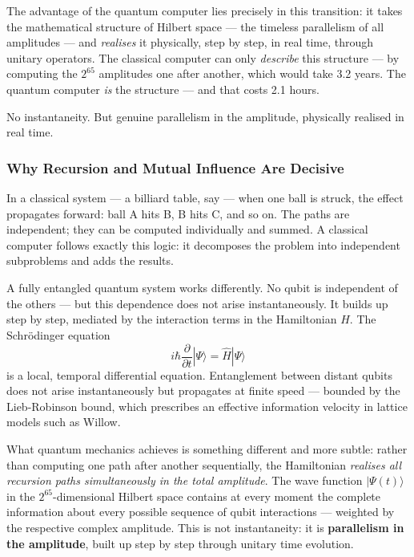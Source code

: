 The advantage of the quantum computer lies precisely in this transition: it takes
the mathematical structure of Hilbert space — the timeless parallelism of all
amplitudes — and \emph{realises} it physically, step by step, in real time, through
unitary operators. The classical computer can only \emph{describe} this structure —
by computing the $2^{65}$ amplitudes one after another, which would take 3.2 years.
The quantum computer \emph{is} the structure — and that costs 2.1 hours.

No instantaneity. But genuine parallelism in the amplitude, physically realised
in real time.

\subsubsection*{Why Recursion and Mutual Influence Are Decisive}

In a classical system — a billiard table, say — when one ball is struck, the effect
propagates forward: ball A hits B, B hits C, and so on. The paths are independent;
they can be computed individually and summed. A classical computer follows exactly
this logic: it decomposes the problem into independent subproblems and adds the results.

A fully entangled quantum system works differently.
No qubit is independent of the others — but this dependence does not arise
instantaneously. It builds up step by step, mediated by the interaction terms
in the Hamiltonian $\hat{H}$. The Schrödinger equation
\begin{equation}
    i\hbar \frac{\partial}{\partial t}|\Psi\rangle = \hat{H}|\Psi\rangle
\end{equation}
is a local, temporal differential equation. Entanglement between distant qubits
does not arise instantaneously but propagates at finite speed — bounded by the
Lieb-Robinson bound, which prescribes an effective information velocity in lattice
models such as Willow.

What quantum mechanics achieves is something different and more subtle: rather than
computing one path after another sequentially, the Hamiltonian
\emph{realises all recursion paths simultaneously in the total amplitude}. The wave
function $|\Psi(t)\rangle$ in the $2^{65}$-dimensional Hilbert space contains at
every moment the complete information about every possible sequence of qubit
interactions — weighted by the respective complex amplitude. This is not
instantaneity: it is \textbf{parallelism in the amplitude}, built up step by step
through unitary time evolution.

